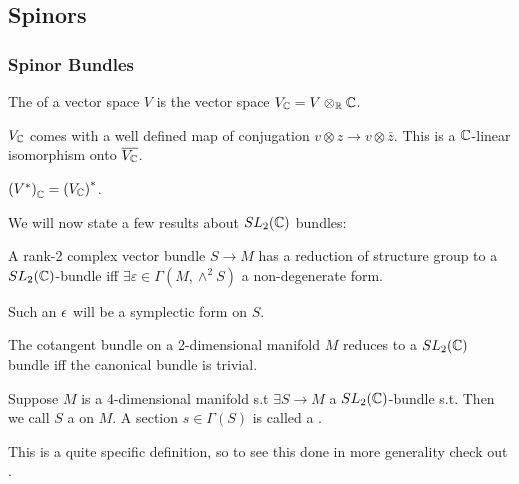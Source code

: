 \documentclass{article}
\begin{document}
\subsection{Spinors}
\subsubsection{Spinor Bundles}
\begin{definition}
	The  of a vector space $V$ is the vector space $V_{\mathbb{C}} = V \otimes_{\mathbb{R}} \mathbb{C}$. 
\end{definition}
\begin{prop}
	$V_{\mathbb{C}}$ comes with a well defined map of conjugation $v \otimes z \to v \otimes \bar{z}$. This is a $\mathbb{C}$-linear isomorphism onto $\overline{V_{\mathbb{C}}}$. 
\end{prop}
\begin{lemma}
	$\left( V^\ast \right)_{\mathbb{C}} = \left( V_{\mathbb{C}} \right)^\ast$. 
\end{lemma}

We will now state a few results about $SL_2(\mathbb{C})$ bundles:
\begin{lemma}
	A rank-2 complex vector bundle $S \to M$ has a reduction of structure group to a $SL_2(\mathbb{C})$-bundle iff $\exists \varepsilon \in \Gamma(M,\wedge^2 S)$ a non-degenerate form. 
\end{lemma}

\begin{remark}
	Such an $\epsilon$ will be a symplectic form on $S$.
\end{remark}

\begin{corollary}
	The cotangent bundle on a 2-dimensional manifold $M$ reduces to a $SL_2(\mathbb{C})$ bundle iff the canonical bundle is trivial.  
\end{corollary}

\begin{definition}
	Suppose $M$ is a 4-dimensional manifold s.t $\exists S \to M$ a $SL_2(\mathbb{C})$-bundle s.t. 
Then we call $S$ a  on  $M$. A section $s \in \Gamma(S)$ is called a .   
\end{definition}

\begin{remark}
	This is a quite specific definition, so to see this done in more generality check out \cite{Michelsohn1989}. 
\end{remark}
\end{document}
